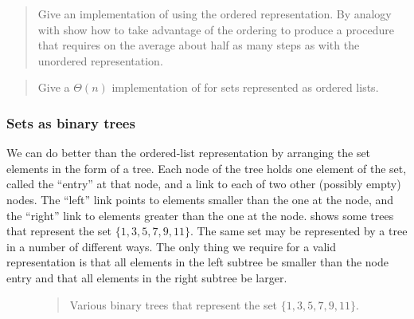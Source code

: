 \begin{quote}
 Give an implementation of
 using the ordered representation.  By analogy with
 show how to take advantage of the ordering to produce a
procedure that requires on the average about half as many steps as with the
unordered representation.
\end{quote}

\begin{quote}
 Give a \( \Theta(n) \)
implementation of  for sets represented as ordered lists.
\end{quote}

\subsubsection*{Sets as binary trees}

We can do better than the ordered-list representation by arranging the set
elements in the form of a tree.  Each node of the tree holds one element of the
set, called the ``entry'' at that node, and a link to each of two other
(possibly empty) nodes.  The ``left'' link points to elements smaller than the
one at the node, and the ``right'' link to elements greater than the one at the
node.   shows some trees that represent the set
\( \{1, 3, 5, 7, 9, 11\} \).  The same set may be represented by a tree in a number of
different ways.  The only thing we require for a valid representation is that
all elements in the left subtree be smaller than the node entry and that all
elements in the right subtree be larger.

\begin{figure}[tb]
\label{Figure 2.16}
\centering
\begin{comment}
\heading{Figure 2.16:} Various binary trees that represent the set \( \{1, 3, 5, 7, 9, 11\} \).

\begin{example}
   7          3             5
   /\         /\            /\
  3  9       1  7          3  9
 /\   \         /\        /   /\
1  5  11       5  9      1   7  11
                   \
                   11
\end{example}
\end{comment}

\begin{quote}
 Various binary trees that represent the set \( \{1, 3, 5, 7, 9, 11\} \).
\end{quote}
\end{figure}

